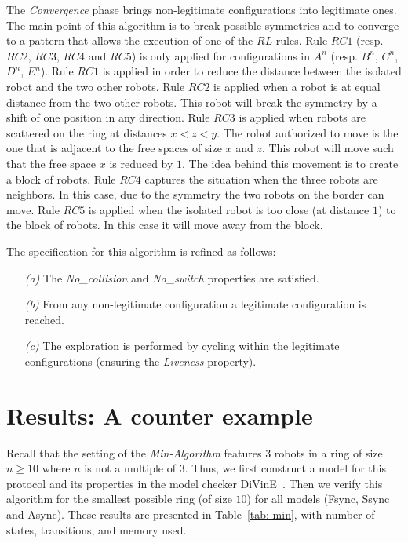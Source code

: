 The \emph{Convergence} phase 
brings non-legitimate configurations into legitimate ones. The main
point of this algorithm is to break possible symmetries and to
converge to a pattern that allows the execution of one of the $RL$
rules.  Rule $RC1$ (resp. $RC2$, $RC3$, $RC4$ and $RC5$) is only
applied for configurations in $A^n$ (resp. $B^n$, $C^n$, $D^n$, 
$E^n$). Rule $RC1$ is applied in order to reduce the distance between
the isolated robot and the two other robots. Rule $RC2$ is applied
when a robot is at equal distance from the two other robots.  This
robot will break the symmetry by a shift of one position in any
direction. Rule $RC3$ is applied when robots are scattered on the ring
at distances $x<z<y$. The robot authorized to move is the one that is
adjacent to the free spaces of size $x$ and $z$. This robot will move
such that the free space $x$ is reduced by $1$. The idea behind this
movement is to create a block of robots. Rule $RC4$ captures the
situation when the three robots are neighbors.  In this case, due to
the symmetry the two robots on the border can move.
Rule $RC5$ is applied when the isolated robot is too close (at
distance $1$) to the block of robots. In this case it will move away
from the block.


The specification for this algorithm is refined as follows: 
\begin{itemize}%
\item[\emph{(a)}] The \emph{No\_collision} and \emph{No\_switch}
  properties are satisfied.
\item[\emph{(b)}]  From any non-legitimate configuration a
  legitimate configuration is reached.
\item[\emph{(c)}] The exploration is performed by cycling within the
  legitimate configurations (ensuring the \emph{Liveness} property).
\end{itemize}

		\section{Results: A counter example}
		
Recall that the setting of the \emph{Min-Algorithm} features $3$
robots in a ring of size $n \geq 10$ where $n$ is not a multiple of
$3$. Thus, we first construct a model for this protocol and its
properties in the model checker DiVinE~\cite{Divine13}. Then
we verify this algorithm for the smallest possible ring (of size $10$) 
for all models (Fsync, Ssync and Async). These results are presented
in Table~\ref{tab: min}, with number of states, transitions, and memory
used.
 
